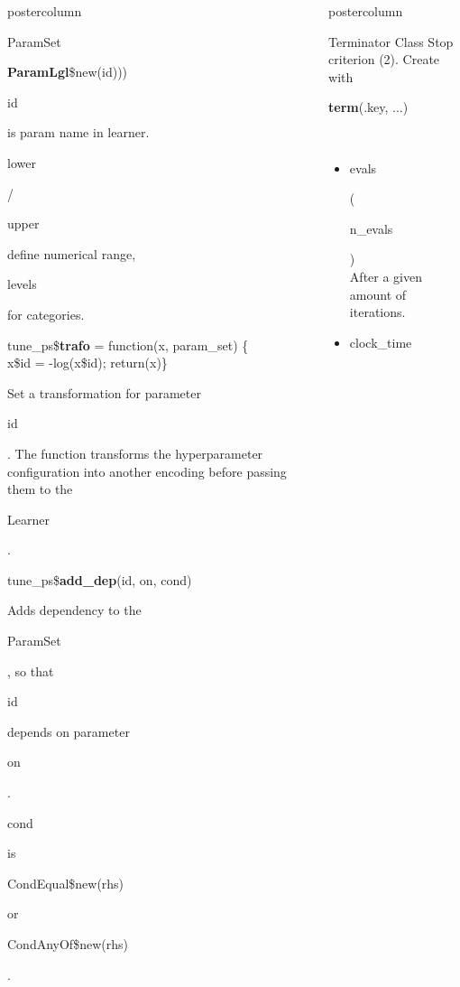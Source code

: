 \documentclass{beamer}
\newlength{\columnheight} %
\newcommand{\codeinline}[1]{\begin{codeboxinline}#1\end{codeboxinline}}
\begin{document}
\begin{frame}[fragile]{}
\begin{columns}
\begin{column}{.245\textwidth}
\begin{beamercolorbox}[center]{postercolumn}
\begin{minipage}{.98\textwidth}
{\begin{myblock}{ParamSet}
\begin{codeboxmultiline}[width=20.75cm]
								\hspace*{1ex}\textbf{ParamLgl}\$new(id)))
							\end{codeboxmultiline}
                            \codeinline{id} is param name in learner. 
                            \codeinline{lower}/\codeinline{upper} define 
                            numerical range, \codeinline{levels} for categories.
                            \\ 
							\begin{codeboxmultiline}[width=25.5cm]
								tune\_ps\$\textbf{trafo} = function(x, param\_set) \{\\
								\hspace*{1ex}x\$id = -log(x\$id); return(x)\}      
							\end{codeboxmultiline}
							Set a transformation for parameter \codeinline{id}. 
							The function transforms the hyperparameter configuration into another encoding 
							before passing them to the \codeinline{Learner}.
							\\
							\begin{codebox}
								tune\_ps\$\textbf{add\_dep}(id, on, cond)
							\end{codebox}
							Adds dependency to the \codeinline{ParamSet}, 
							so that \codeinline{id} depends on parameter \codeinline{on}.
							\codeinline{cond} is \codeinline{CondEqual\$new(rhs)} or \codeinline{CondAnyOf\$new(rhs)}.
						\end{myblock}
						\vfill}
				\end{minipage}
			\end{beamercolorbox}
		\end{column}
		\begin{column}{.245\textwidth}
			\begin{beamercolorbox}[center]{postercolumn}
				\begin{minipage}{.98\textwidth}
					\parbox[t][\columnheight]{\textwidth}{
						\begin{myblock}{Terminator Class}
							Stop criterion (2). Create with \codeinline{\textbf{term}(.key, ...)}
							\\
							\begin{itemize}
                                \item \codeinline{evals}
                                (\codeinline{n\_evals})\\
                                After a given amount of iterations.
								\item \codeinline{clock\_time} 

\end{itemize}
\end{myblock}}
\end{minipage}
\end{beamercolorbox}
\end{column}
\end{columns}
\end{frame}
\end{document}
